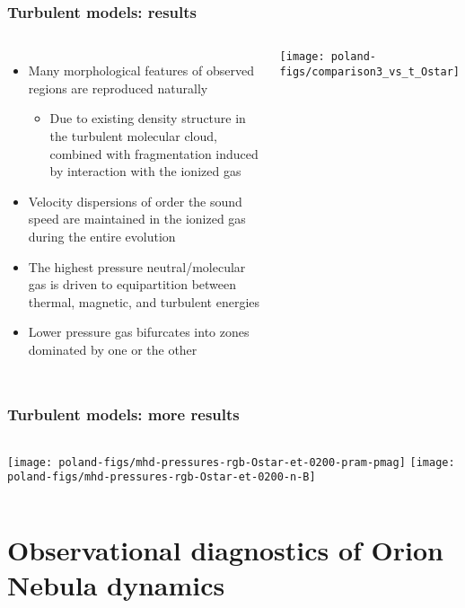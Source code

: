 \documentclass[presentation, draft]{beamer}
\begin{document}
\begin{frame}
  \frametitle{Turbulent models: results}
  \begin{columns}
    \begin{itemize}
    \item Many morphological features of observed \hii{} regions are
      reproduced naturally
      \begin{itemize}
      \item Due to existing density structure in the
        turbulent molecular cloud, combined with fragmentation induced
        by interaction with the ionized gas
      \end{itemize}
    \item Velocity dispersions of order the sound speed are
      maintained in the ionized gas during the entire evolution
    \item The highest pressure neutral/molecular gas is driven to
      equipartition between thermal, magnetic, and turbulent energies
    \item Lower pressure gas bifurcates into zones dominated by one or
      the other
    \end{itemize}
    \texttt{[image: poland-figs/comparison3\_vs\_t\_Ostar]}%
  \end{columns}
\end{frame}

\begin{frame}
  \frametitle{Turbulent models: more results}
  \begin{columns}
    \texttt{[image: poland-figs/mhd-pressures-rgb-Ostar-et-0200-pram-pmag]}
    \texttt{[image: poland-figs/mhd-pressures-rgb-Ostar-et-0200-n-B]}
  \end{columns}
\end{frame}

\section{Observational diagnostics of Orion Nebula dynamics}
\label{sec:obs}
\end{document}
